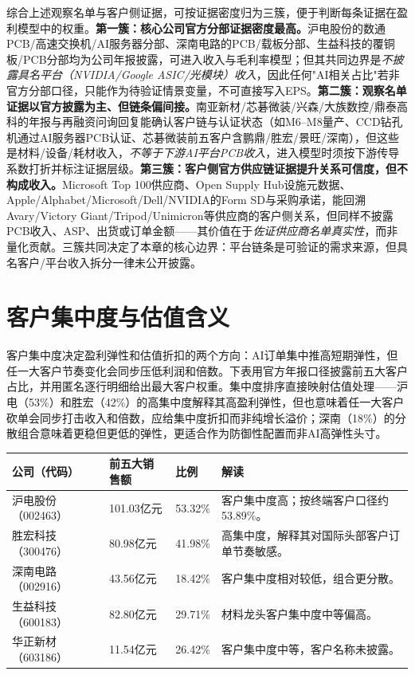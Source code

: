 综合上述观察名单与客户侧证据，可按证据密度归为三簇，便于判断每条证据在盈利模型中的权重。\textbf{第一簇：核心公司官方分部证据密度最高。}沪电股份的数通PCB/高速交换机/AI服务器分部、深南电路的PCB/载板分部、生益科技的覆铜板/PCB分部均为公司年报披露，可进入收入与毛利率模型；但其共同边界是\emph{不披露具名平台（NVIDIA/Google ASIC/光模块）收入}，因此任何"AI相关占比"若非官方分部口径，只能作为待验证情景变量，不可直接写入EPS。\textbf{第二簇：观察名单证据以官方披露为主、但链条偏间接。}南亚新材/芯碁微装/兴森/大族数控/鼎泰高科的年报与再融资问询回复能确认客户链与认证状态（如M6--M8量产、CCD钻孔机通过AI服务器PCB认证、芯碁微装前五客户含鹏鼎/胜宏/景旺/深南），但这些是材料/设备/耗材收入，\emph{不等于下游AI平台PCB收入}，进入模型时须按下游传导系数打折并标注证据层级。\textbf{第三簇：客户侧官方供应链证据提升关系可信度，但不构成收入。}Microsoft Top 100供应商、Open Supply Hub设施元数据、Apple/Alphabet/Microsoft/Dell/NVIDIA的Form SD与采购承诺，能回溯Avary/Victory Giant/Tripod/Unimicron等供应商的客户侧关系，但同样不披露PCB收入、ASP、出货或订单金额——其价值在于\emph{佐证供应商名单真实性}，而非量化贡献。三簇共同决定了本章的核心边界：平台链条是可验证的需求来源，但具名客户/平台收入拆分一律未公开披露。

\section{客户集中度与估值含义}

客户集中度决定盈利弹性和估值折扣的两个方向：AI订单集中推高短期弹性，但任一大客户节奏变化会同步压低利润和倍数。下表用官方年报口径披露前五大客户占比，并用匿名逐行明细给出最大客户权重。集中度排序直接映射估值处理——沪电（53\%）和胜宏（42\%）的高集中度解释其高盈利弹性，但也意味着任一大客户砍单会同步打击收入和倍数，应给集中度折扣而非纯增长溢价；深南（18\%）的分散组合意味着更稳但更低的弹性，更适合作为防御性配置而非AI高弹性头寸。

\begin{exhibitbox}[图表5-14：官方前五大客户集中度]
\small
\begin{tabularx}{\textwidth}{L{1.8cm}R{2.4cm}R{2.0cm}X}
\toprule
\textbf{公司（代码）} & \textbf{前五大销售额} & \textbf{比例} & \textbf{解读} \\
\midrule
沪电股份（002463） & 101.03亿元 & 53.32\% & 客户集中度高；按终端客户口径约53.89\%。 \\
胜宏科技（300476） & 80.98亿元 & 41.98\% & 高集中度，解释其对国际头部客户订单节奏敏感。 \\
深南电路（002916） & 43.56亿元 & 18.42\% & 客户集中度相对较低，组合更分散。 \\
生益科技（600183） & 82.80亿元 & 29.71\% & 材料龙头客户集中度中等偏高。 \\
华正新材（603186） & 11.54亿元 & 26.42\% & 客户集中度中等，客户名称未披露。 \\
\bottomrule
\end{tabularx}
\end{exhibitbox}

